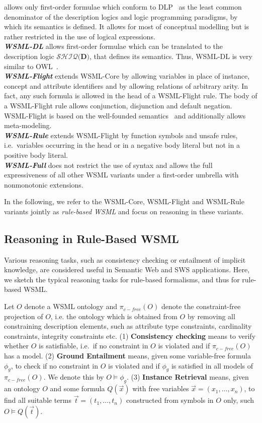  allows only first-order
formulae which conform to DLP~\cite{dlp} as the least common
denominator of the description logics and logic programming
paradigms, by which its semantics is defined. It allows for most
of conceptual modelling but is rather restricted in the use of
logical expressions.
\\
{\sl \bfseries WSML-DL} allows first-order formulae which can be
translated to the description logic $\mathcal{SHIQ}(\mathbf{D)}$,
that defines its semantics. Thus, WSML-DL is very similar to
OWL~\cite{Dean+Schreiber-OntoLangRefe:04}.
\\
{\sl \bfseries WSML-Flight} extends WSML-Core by allowing
variables in place of instance, concept and attribute identifiers
and by allowing relations of arbitrary arity. In fact, any such
formula is allowed in the head of a WSML-Flight rule. The body of
a WSML-Flight rule allows conjunction, disjunction and default
negation. WSML-Flight is based on the well-founded
semantics~\cite{Gelder+RossETAL-WellSemaGeneLogi:91} and
additionally allows meta-modeling.
\\
{\sl \bfseries WSML-Rule} extends WSML-Flight by function symbols
and unsafe rules, i.e.\ variables occurring in the head or in a
negative body literal but not in a positive body literal.
\\
{\sl \bfseries WSML-Full} does not restrict the use of syntax and
allows the full expressiveness of all other WSML variants under a
first-order umbrella with nonmonotonic extensions.

In the following, we refer to the WSML-Core, WSML-Flight and
WSML-Rule variants jointly as \emph{rule-based WSML} and focus on
reasoning in these variants.

\subsection{Reasoning in Rule-Based WSML}
Various reasoning tasks, such as consistency checking or
entailment of implicit knowledge, are considered useful in
Semantic Web and SWS applications. Here, we sketch the typical
reasoning tasks for rule-based formalisms, and thus for rule-based
WSML.

Let $O$ denote a WSML ontology and $\pi_{c-free}(O)$ denote the
constraint-free projection of $O$, i.e. the ontology which is
obtained from $O$ by removing all constraining description
elements, such as attribute type constraints, cardinality
constraints, integrity constraints etc. (1) {\bf Consistency
checking} means to verify whether $O$ is satisfiable, i.e.\ if no
constraint in $O$ is violated and if $\pi_{c-free}(O)$ has a
model. (2) {\bf Ground Entailment} means, given some variable-free
formula $\phi_g$, to check if no constraint in $O$ is violated and
if $\phi_g$ is satisfied in all models of $\pi_{c-free}(O)$. We
denote this by $O \models \phi_g$. (3) {\bf Instance Retrieval}
means, given an ontology $O$ and some formula $Q(\vec{x})$ with
free variables $\vec{x} = (x_1,\ldots,x_n)$, to find all suitable
terms $\vec{t} = (t_1,\ldots,t_n)$ constructed from symbols in $O$
only, such $O \models Q(\vec{t})$.
